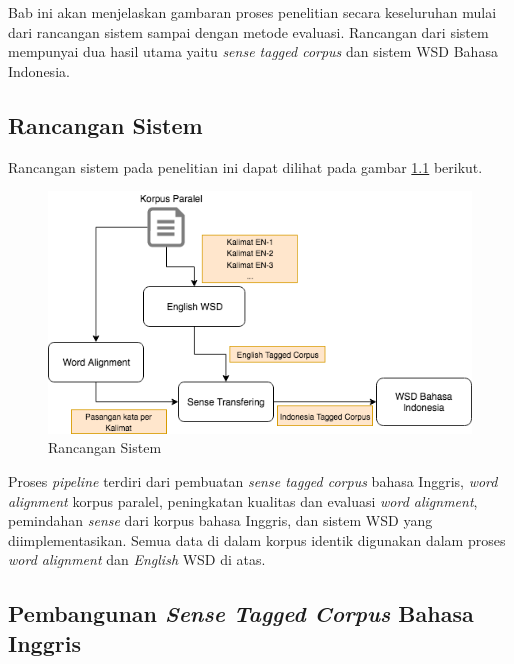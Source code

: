 \chapter{\babTiga}
Bab ini akan menjelaskan gambaran proses penelitian secara keseluruhan mulai dari rancangan sistem sampai dengan metode evaluasi. Rancangan dari sistem mempunyai dua hasil utama yaitu \textit{sense tagged corpus} dan sistem WSD Bahasa Indonesia.

\section{Rancangan Sistem}

Rancangan sistem pada penelitian ini dapat dilihat pada gambar \ref{fig:Rancangan-Sistem} berikut.

\begin{figure}
	\centering
	\includegraphics[width=1\linewidth]{adit_pics/WSD-full.png}
	\caption{Rancangan Sistem}
	\label{fig:Rancangan-Sistem}
\end{figure}

Proses \textit{pipeline} terdiri dari pembuatan \textit{sense tagged corpus} bahasa Inggris,  \textit{word alignment} korpus paralel, peningkatan kualitas dan evaluasi \textit{word alignment}, pemindahan \textit{sense} dari korpus bahasa Inggris, dan sistem WSD yang diimplementasikan. Semua data di dalam korpus identik digunakan dalam proses \textit{word alignment} dan \textit{English} WSD di atas.

\section{Pembangunan \textit{Sense Tagged Corpus} Bahasa Inggris}

